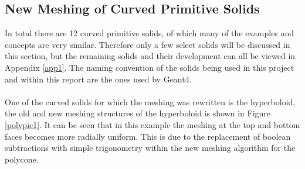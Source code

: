 \documentclass[12pt,a4paper]{article}
\begin{document}
\subsection{New Meshing of Curved Primitive Solids}
In total there are 12 curved primitive solids, of which many of the examples and concepts are very similar. Therefore only a few select solids will be discussed in this section, but the remaining solids and their development can all be viewed in Appendix \ref{app1}. The naming convention of the solids being used in this project and within this report are the ones used by Geant4.
\\\\
One of the curved solids for which the meshing was rewritten is the hyperboloid, the old and new meshing structures of the hyperboloid is shown in Figure \ref{polypic1}. It can be seen that in this example the meshing at the top and bottom faces becomes more radially uniform. This is due to the replacement of boolean subtractions with simple trigonometry within the new meshing algorithm for the polycone.
\\\\
\end{document}
